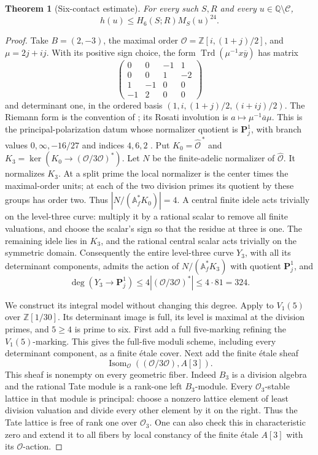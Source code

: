 \documentclass[11pt]{article}
\newtheorem{theorem}{Theorem}[section]
\theoremstyle{definition}
\theoremstyle{remark}
\newcommand{\Q}{\mathbb Q}
\newcommand{\Z}{\mathbb Z}
\newcommand{\Cset}{\mathcal C}
\newcommand{\Trd}{\operatorname{Trd}}
\begin{document}
\begin{theorem}[Six-contact estimate]\label{thm:height}
For every such $S,R$ and every $u\in\Q\setminus\Cset$,
\[
 h(u)\le H_6(S;R)M_S(u)^{24}.
\]
\end{theorem}
\begin{proof}
Take $B=(2,-3)$, the maximal order $\mathcal O=\Z[i,(1+j)/2]$, and
$\mu=2j+ij$. With its positive sign choice, the form
$\Trd(\mu^{-1}x\overline y)$ has matrix
\[
 \begin{pmatrix}0&0&-1&1\\0&0&1&-2\\1&-1&0&0\\-1&2&0&0\end{pmatrix}
\]
and determinant one, in the ordered basis
$(1,i,(1+j)/2,(i+ij)/2)$. The Riemann form is the convention of
\cite[equation (3) and Lemma 3]{linyang}; its Rosati involution is
$a\mapsto\mu^{-1}\overline a\mu$. This is the principal-polarization datum whose
normalizer quotient is $\mathbf P^1_j$, with branch values
$0,\infty,-16/27$ and indices $4,6,2$ \cite{babagranath,linyang}.
Put $K_0=\widehat{\mathcal O}^{\,*}$ and
$K_3=\ker(K_0\longrightarrow(\mathcal O/3\mathcal O)^*)$.
Let $N$ be the finite-adelic normalizer of $\widehat{\mathcal O}$.
It normalizes $K_3$. At a split prime the local normalizer is the
center times the maximal-order units; at each of the two division
primes its quotient by these groups has order two. Thus
$|N/(\mathbb A_f^*K_0)|=4$.
A central finite idele acts trivially on the level-three curve:
multiply it by a rational scalar to remove all finite valuations,
and choose the scalar's sign so that the residue at three is one.
The remaining idele lies in $K_3$, and the rational central scalar
acts trivially on the symmetric domain. Consequently the entire
level-three curve $Y_3$, with all its determinant components, admits
the action of $N/(\mathbb A_f^*K_3)$ with quotient $\mathbf P^1_j$,
and
\[
 \deg(Y_3\longrightarrow\mathbf P^1_j)
 \le4|(\mathcal O/3\mathcal O)^*|\le4\cdot81=324.
\]

We construct its integral model without changing this degree.
Apply \cite[Theorem 2.1 and Corollary 2.3]{buzzard} to $V_1(5)$
over $\mathbb Z[1/30]$. Its determinant image is full, its level
is maximal at the division primes, and $5\ge4$ is prime to six.
First add a full five-marking refining the $V_1(5)$-marking.
This gives the full-five moduli scheme, including every determinant
component, as a finite \'{e}tale cover. Next add the finite \'{e}tale sheaf
\[
 \operatorname{Isom}_{\mathcal O}
       ((\mathcal O/3\mathcal O),A[3]).
\]
This sheaf is nonempty on every geometric fiber. Indeed $B_3$ is
a division algebra and the rational Tate module is a rank-one
left $B_3$-module. Every $\mathcal O_3$-stable lattice in that module
is principal: choose a nonzero lattice element of least division
valuation and divide every other element by it on the right.
Thus the Tate lattice is free of rank one over $\mathcal O_3$.
One can also check this in characteristic zero and extend it to
all fibers by local constancy of the finite \'{e}tale $A[3]$ with its
$\mathcal O$-action.


\end{proof}
\end{document}
